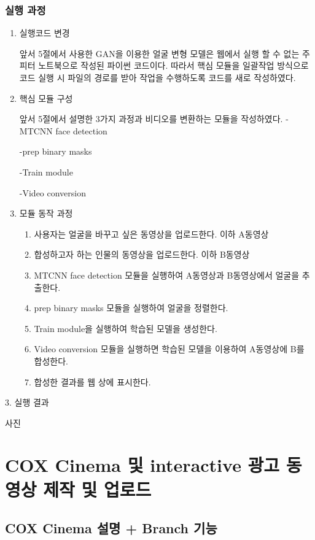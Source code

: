 \documentclass{oblivoir}
\begin{document}
\subsection{실행 과정}
\begin{enumerate}%

    \item 실행코드 변경

    앞서 5절에서 사용한 GAN을 이용한 얼굴 변형 모델\cite{reference13}은 웹에서 실행 할 수 없는 주피터 노트북으로 작성된 파이썬 코드이다. 따라서 핵심 모듈을 일괄작업 방식으로 코드 실행 시 파일의 경로를 받아 작업을 수행하도록 코드를 새로 작성하였다.

    \item 핵심 모듈 구성

    앞서 5절에서 설명한 3가지 과정과 비디오를 변환하는 모듈을 작성하였다.
    -MTCNN face detection


    -prep binary masks

    -Train module

    -Video conversion

    \item 모듈 동작 과정
    \begin{enumerate}
        \item  사용자는 얼굴을 바꾸고 싶은 동영상을 업로드한다. 이하 A동영상
        \item 합성하고자 하는 인물의 동영상을 업로드한다. 이하 B동영상
        \item MTCNN face detection 모듈을 실행하여 A동영상과 B동영상에서 얼굴을 추출한다.
        \item prep binary masks 모듈을 실행하여 얼굴을 정렬한다.
        \item Train module을 실행하여 학습된 모델을 생성한다.
        \item Video conversion 모듈을 실행하면 학습된 모델을 이용하여 A동영상에 B를 합성한다.
        \item 합성한 결과를 웹 상에 표시한다.
    \end{enumerate}

\end{enumerate}
3. 실행 결과

사진

\chapter{ COX Cinema 및 interactive 광고 동영상 제작 및 업로드}

\section{ COX Cinema 설명 + Branch 기능}
\end{document}
